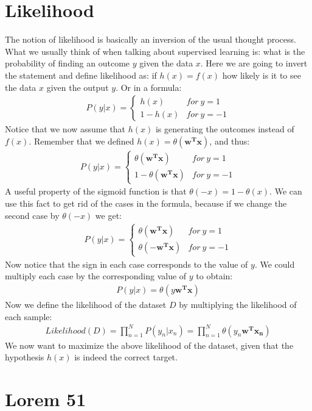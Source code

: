 \section{Likelihood}
The notion of likelihood is basically an inversion of the usual thought process. What we usually think of when talking about supervised learning is: what is the probability of finding an outcome $y$ given the data $x$. Here we are going to invert the statement and define likelihood as: if $h(x) = f(x)$ how likely is it to see the data $x$ given the output $y$. Or in a formula:
\begin{equation}
\begin{split}
P(y | x) =
\begin{cases} 
h(x) & for\ y=1 \\
1-h(x) & for\ y=-1 
\end{cases}
\end{split}
\end{equation}
Notice that we now assume that $h(x)$ is generating the outcomes instead of $f(x)$.
Remember that we defined $h(x) = \theta(\bm{w^{T}x})$, and thus: 
\begin{equation}
\begin{split}
P(y | x) =
\begin{cases} 
\theta(\bm{w^{T}x}) & for\ y=1 \\
1-\theta(\bm{w^{T}x}) & for\ y=-1 
\end{cases}
\end{split}
\end{equation}
A useful property of the sigmoid function is that $\theta(-x) = 1-\theta(x)$. We can use this fact to get rid of the cases in the formula, because if we change the second case by $\theta(-x)$ we get:
\begin{equation}
\begin{split}
P(y | x) =
\begin{cases} 
\theta(\bm{w^{T}x}) & for\ y=1 \\
\theta(\bm{-w^{T}x}) & for\ y=-1 
\end{cases}
\end{split}
\end{equation}
Now notice that the sign in each case corresponds to the value of $y$. We could multiply each case by the corresponding value of $y$ to obtain:
\begin{equation}
\begin{split}
P(y | x) = \theta(y\bm{w^{T}x})
\end{split}
\end{equation}
Now we define the likelihood of the dataset $D$ by multiplying the likelihood of each sample:
\begin{equation}
\begin{split}
Likelihood(D) = \prod_{n=1}^{N}P(y_{n}|x_{n}) = \prod_{n=1}^{N}\theta(y_{n}\bm{w^{T}x_{n}})
\end{split}
\end{equation}
We now want to maximize the above likelihood of the dataset, given that the hypothesis $h(x)$ is indeed the correct target.

\section{Lorem 51}
\lipsum[51]

